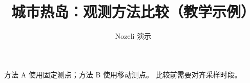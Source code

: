 \documentclass{article}
\title{城市热岛：观测方法比较（教学示例）}
\author{Nozeli 演示}
\begin{document}
\maketitle
方法 A 使用固定测点；方法 B 使用移动测点。
比较前需要对齐采样时段。
\end{document}
